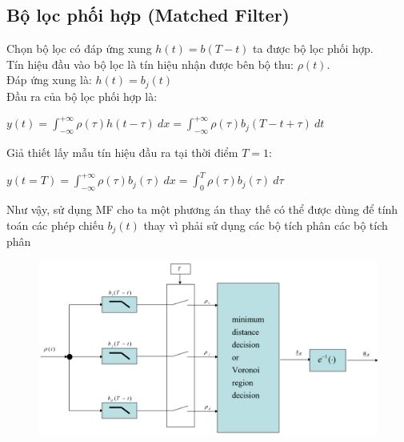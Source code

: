 \subsection{Bộ lọc phối hợp (Matched Filter)}
Chọn bộ lọc có đáp ứng xung $h(t) = b(T-t)$ ta được bộ lọc phối hợp.\\
Tín hiệu đầu vào bộ lọc là tín hiệu nhận được bên bộ thu: $\rho (t)$. \\
Đáp ứng xung là: $h(t) = b_{j}(t)$ \\
Đầu ra của bộ lọc phối hợp là: 
\begin{center}
    $y(t) = \int_{-\infty}^{+\infty} \rho(\tau)h(t-\tau)\  dx = \int_{-\infty}^{+\infty} \rho(\tau)b_{j}(T-t+\tau)\  dt$
\end{center}
Giả thiết lấy mẫu tín hiệu đầu ra tại thời điểm $T = 1$:
\begin{center}
    $y(t=T) = \int_{-\infty}^{+\infty} \rho(\tau)b_{j}(\tau)\  dx = \int_{0}^{T} \rho(\tau)b_{j}(\tau)\  d\tau$
\end{center}
Như vậy, sử dụng MF cho ta một phương án thay thế có thể được dùng để tính toán các phép chiếu $b_{j}(t)$ thay vì phải sử dụng các bộ tích phân các bộ tích phân
\begin{center}
    \begin{figure}[htp]
    \begin{center}
     \includegraphics[width=\textwidth]{Img/MF.png}
    \end{center}
    \end{figure}
\end{center}
\newpage
